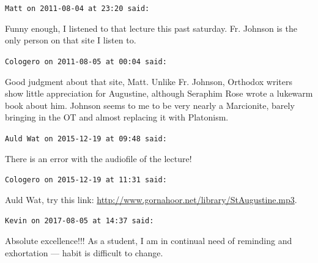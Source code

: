 \begin{footnotesize}
\begin{sffamily}
\texttt{Matt on 2011-08-04 at 23:20 said:}

Funny enough, I listened to that lecture this past saturday. Fr. Johnson is the only person on that site I listen to.

\hfill

\texttt{Cologero on 2011-08-05 at 00:04 said:}

Good judgment about that site, Matt. Unlike Fr. Johnson, Orthodox writers show little appreciation for Augustine, although Seraphim Rose wrote a lukewarm book about him. Johnson seems to me to be very nearly a Marcionite, barely bringing in the OT and almost replacing it with Platonism.

\hfill

\texttt{Auld Wat on 2015-12-19 at 09:48 said:}

There is an error with the audiofile of the lecture!

\hfill

\texttt{Cologero on 2015-12-19 at 11:31 said:}

Auld Wat, try this link:
\url{http://www.gornahoor.net/library/StAugustine.mp3}.


\hfill

\texttt{Kevin on 2017-08-05 at 14:37 said:}

Absolute excellence!!! As a student, I am in continual need of reminding and exhortation --- habit is difficult to change.


\hfill

\end{sffamily}
\end{footnotesize}

